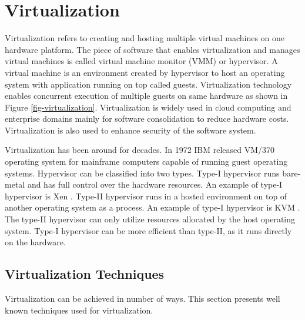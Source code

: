 

\section{Virtualization} %
Virtualization refers to creating and hosting multiple virtual machines on one hardware platform.
The piece of software that enables virtualization and manages virtual machines is called virtual machine monitor (VMM) or hypervisor.
A virtual machine is an environment created by hypervisor to host an operating system with application running on top called guests.
Virtualization technology enables concurrent execution of multiple guests on same hardware as shown in Figure \ref{fig-virtualization}.
Virtualization is widely used in cloud computing and enterprise domains mainly for software consolidation to reduce hardware costs.
Virtualization is also used to enhance security of the software system.



Virtualization has been around for decades. In 1972 IBM released VM/370 operating system for mainframe computers capable of running guest operating systems.
Hypervisor can be classified into two types.
Type-I hypervisor runs bare-metal and has full control over the hardware resources.
An example of type-I hypervisor is Xen \cite{Barham:2003:XAV:1165389.945462}.
Type-II hypervisor runs in a hosted environment on top of another operating system as a process.
An example of type-I hypervisor is KVM \cite{kivity2007kvm}.
The type-II hypervisor can only utilize resources allocated by the host operating system.
Type-I hypervisor can be more efficient than type-II, as it runs directly on the hardware.

\subsection{Virtualization Techniques}
Virtualization can be achieved in number of ways. This section presents well known techniques used for virtualization.


